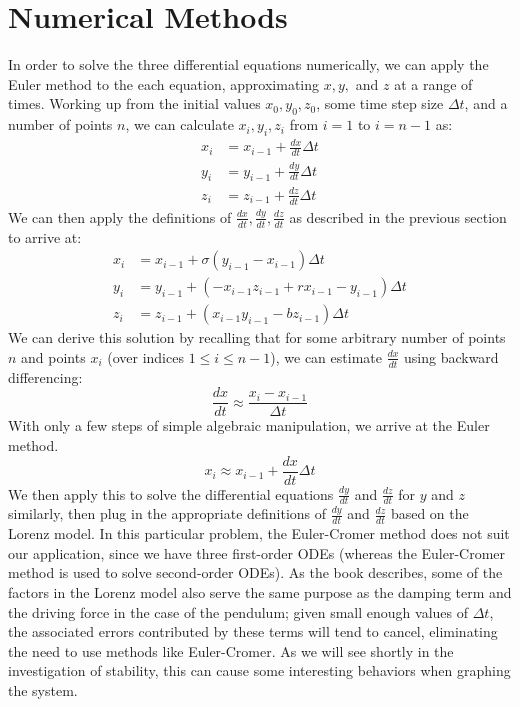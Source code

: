 \documentclass[12pt]{amsart}
\begin{document}
\section{Numerical Methods}
In order to solve the three differential equations numerically, we can apply the Euler method to the each equation, approximating $x, y,$ and $z$
at a range of times. Working up from the initial values $x_0, y_0, z_0$, some time step size $\Delta t$, and a number of points $n$, we can
calculate $x_i, y_i, z_i$ from $i = 1$ to $i = n - 1$ as:
\begin{align*}
	x_i &= x_{i-1} + \frac{dx}{dt} \Delta t \\
	y_i &= y_{i-1} + \frac{dy}{dt} \Delta t \\
	z_i &= z_{i-1} + \frac{dz}{dt} \Delta t
\end{align*}
We can then apply the definitions of $\frac{dx}{dt}, \frac{dy}{dt}, \frac{dz}{dt}$ as described in the previous section to arrive at:
\begin{align*}
	x_i &=  x_{i-1} + \sigma(y_{i-1} - x_{i-1}) \Delta t \\
	y_i &= y_{i-1} + (-x_{i-1}z_{i-1} + rx_{i-1} - y_{i-1}) \Delta t \\
	z_i &= z_{i-1} + (x_{i-1}y_{i-1} - bz_{i-1}) \Delta t
\end{align*}
We can derive this solution by recalling that for some arbitrary number of points $n$ and points $x_i$ (over indices $1 \leq i \leq n - 1$), we can
estimate $\frac{dx}{dt}$ using backward differencing:
\[
	\frac{dx}{dt} \approx \frac{x_i - x_{i - 1}}{\Delta t}
\]
\newline
With only a few steps of simple algebraic manipulation, we arrive at the Euler method.
\[
	x_i \approx x_{i-1} + \frac{dx}{dt} \Delta t
\]
We then apply this to solve the differential equations $\frac{dy}{dt}$ and $\frac{dz}{dt}$ for $y$ and $z$ similarly, then plug in the appropriate
definitions of $\frac{dy}{dt}$ and $\frac{dz}{dt}$ based on the Lorenz model. In this particular problem, the Euler-Cromer method does not
suit our application, since we have three first-order ODEs (whereas the Euler-Cromer method is used to solve second-order ODEs). As the book
describes, some of the factors in the Lorenz model also serve the same purpose as the damping term and the driving force in the case
of the pendulum; given small enough values of $\Delta t$, the associated errors contributed by these terms will tend to cancel, eliminating the
need to use methods like Euler-Cromer. As we will see shortly in the investigation of stability, this can cause some interesting behaviors when
graphing the system.
\end{document}
